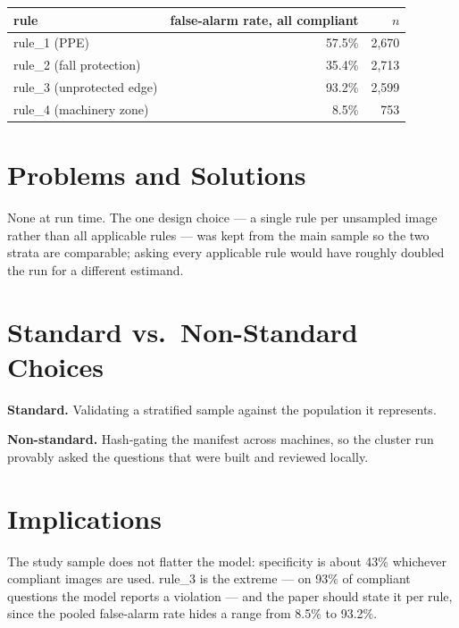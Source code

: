 \begin{center}
\begin{tabular}{lrr}
\toprule
\textbf{rule} & \textbf{false-alarm rate, all compliant} & $n$ \\
\midrule
rule\_1 (PPE)            & 57.5\% & 2,670 \\
rule\_2 (fall protection) & 35.4\% & 2,713 \\
rule\_3 (unprotected edge) & 93.2\% & 2,599 \\
rule\_4 (machinery zone)   & 8.5\%  & 753 \\
\bottomrule
\end{tabular}
\label{tab:s22-rules}
\end{center}

\section{Problems and Solutions}

None at run time. The one design choice --- a single rule per unsampled image rather than all applicable
rules --- was kept from the main sample so the two strata are comparable; asking every applicable rule would
have roughly doubled the run for a different estimand.

\section{Standard vs.\ Non-Standard Choices}

\textbf{Standard.} Validating a stratified sample against the population it represents.

\textbf{Non-standard.} Hash-gating the manifest across machines, so the cluster run provably asked the
questions that were built and reviewed locally.

\section{Implications}

The study sample does not flatter the model: specificity is about 43\% whichever compliant images are used.
rule\_3 is the extreme --- on 93\% of compliant questions the model reports a violation --- and the paper
should state it per rule, since the pooled false-alarm rate hides a range from 8.5\% to 93.2\%.
